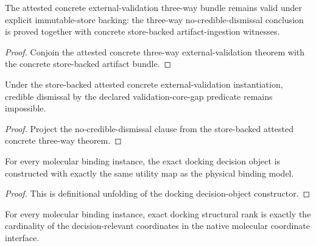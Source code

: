 \begin{theorem}\label{thm:store-backed-attested-concrete-external-validation-threeway-bundle}
The attested concrete external-validation three-way bundle remains valid under explicit immutable-store backing: the three-way no-credible-dismissal conclusion is proved together with concrete store-backed artifact-ingestion witnesses.
\end{theorem}

\begin{proof}
Conjoin the attested concrete three-way external-validation theorem with the concrete store-backed artifact bundle.
\end{proof}

\begin{theorem}\label{thm:store-backed-attested-concrete-external-validation-not-credibly-dismissible}
Under the store-backed attested concrete external-validation instantiation, credible dismissal by the declared validation-core-gap predicate remains impossible.
\end{theorem}

\begin{proof}
Project the no-credible-dismissal clause from the store-backed attested concrete three-way theorem.
\end{proof}

\begin{theorem}\label{thm:md-physical-utility-interface}
For every molecular binding instance, the exact docking decision object is constructed with exactly the same utility map as the physical binding model.
\end{theorem}

\begin{proof}
This is definitional unfolding of the docking decision-object constructor.
\end{proof}

\begin{theorem}\label{thm:md-native-coordinate-rank-identity}
For every molecular binding instance, exact docking structural rank is exactly the cardinality of the decision-relevant coordinates in the native molecular coordinate interface.
\end{theorem}

